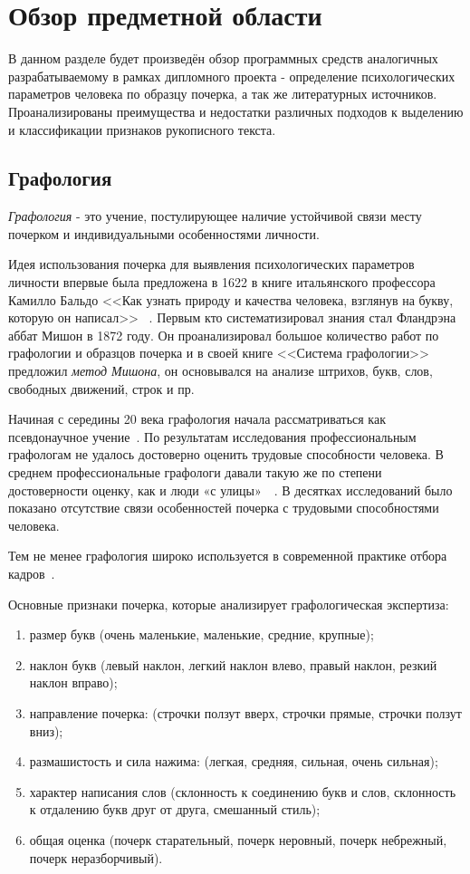 \section{Обзор предметной области}
\label{sec:domain:intro}

В данном разделе будет произведён обзор программных средств аналогичных разрабатываемому в рамках дипломного проекта - определение психологических параметров человека по образцу почерка, а так же литературных источников. Проанализированы преимущества и недостатки различных подходов к выделению и классификации признаков рукописного текста.

\subsection{Графология}
\label{sub:domain:grafologic}
\emph{Графология} - это учение, постулирующее наличие устойчивой связи месту почерком и индивидуальными особенностями личности.

Идея использования почерка для выявления психологических параметров личности впервые была предложена в 1622 в книге итальянского профессора Камилло Бальдо <<Как узнать природу и качества человека, взглянув на букву, которую он написал>> ~\cite{kamillo_grafology}. Первым кто систематизировал знания стал Фландрэна аббат Мишон в 1872 году. Он проанализировал большое количество работ по графологии и образцов почерка и в своей книге <<Система графологии>> предложил \emph{метод Мишона}, он основывался на анализе штрихов, букв, слов, свободных движений, строк и пр.~\cite{mishon_grafology}

Начиная с середины 20 века графология начала рассматриваться как псевдонаучное учение~\cite{graphology_wiki}. По результатам исследования профессиональным графологам не удалось достоверно оценить трудовые способности человека. В среднем профессиональные графологи давали такую же по степени достоверности оценку, как и люди «с улицы»~\cite{neter_shakhar_psevdograph}~\cite{king_koehler_psevdograph}. В десятках исследований было показано отсутствие связи особенностей почерка с трудовыми способностями человека.

Тем не менее графология широко используется в современной практике отбора кадров~\cite{graphology_psyfactor}.

Основные признаки почерка, которые анализирует графологическая экспертиза:
\begin{enumerate}
  \item размер букв (очень маленькие, маленькие, средние, крупные);
  \item наклон букв (левый наклон, легкий наклон влево, правый наклон, резкий наклон вправо);
  \item направление почерка: (строчки ползут вверх, строчки прямые,  строчки ползут вниз);
  \item размашистость и сила нажима: (легкая, средняя, сильная, очень сильная);
  \item характер написания слов (склонность к соединению букв и слов, склонность к отдалению букв друг от друга, смешанный стиль);
  \item общая оценка (почерк старательный, почерк неровный, почерк небрежный, почерк неразборчивый).
\end{enumerate}

